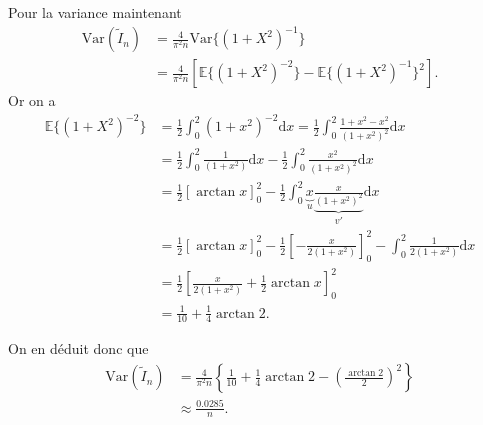 \documentclass[11pt]{td_um}
\begin{document}
\begin{exo}{}
\begin{enumerate}
{                Pour la variance maintenant
                \begin{align*}
                    \mbox{Var}(\tilde{I}_n) &= \frac{4}{\pi^2 n} \mbox{Var}\{(1 + X^2)^{-1}\}\\
                    &= \frac{4}{\pi^2 n} \left[ \mathbb{E}\{(1 + X^2)^{-2}\} -
                    \mathbb{E}\{(1 + X^2)^{-1}\}^2 \right].
                \end{align*}
                Or on a
                \begin{align*}
                    \mathbb{E}\{(1 + X^2)^{-2}\} &= \frac{1}{2} \int_0^2 (1 +
                    x^2)^{-2} \mbox{d$x$} =
                    \frac{1}{2} \int_0^2 \frac{1 +
                    x^2 - x^2}{(1 + x^2)^2}
                    \mbox{d$x$}\\
                    &= \frac{1}{2} \int_0^2 \frac{1}{(1
                    + x^2)} \mbox{d$x$} - \frac{1}{2}
                    \int_0^2 \frac{x^2}{(1 + x^2)^2} \mbox{d$x$}\\
                    &= \frac{1}{2} [\arctan x]_0^2 -
                    \frac{1}{2}\int_0^2
                    \underbrace{x}_u  \underbrace{\frac{x}{(1 +
                    x^2)^2}}_{v'} \mbox{d$x$}\\
                    &= \frac{1}{2} [\arctan x]_0^2 -
                    \frac{1}{2} \left[-\frac{x}{2 (1 + x^2)} \right]_0^2 -
                    \int_0^2 \frac{1}{2 (1 + x^2)} \mbox{d$x$}\\
                    &= \frac{1}{2} \left[\frac{x}{2 (1 + x^2)} + \frac{1}{2}
                    \arctan x \right]_0^2\\
                    &= \frac{1}{10} + \frac{1}{4} \arctan 2.
                \end{align*}

                On en déduit donc que
                \begin{align*}
                    \mbox{Var}(\tilde{I}_n) &= \frac{4}{\pi^2 n} \left\{\frac{1}{10}
                        + \frac{1}{4} \arctan 2 -
                        \left(\frac{\arctan 2}{2} \right)^2
                    \right\}\\
                    &\approx \frac{0.0285}{n}.
                \end{align*}

}
\end{enumerate}
\end{exo}
\end{document}
